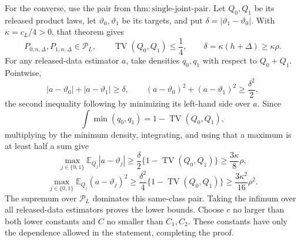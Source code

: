 For the converse, use the pair from \(\mathrm{thm:single\text{-}joint\text{-}pair}\).  Let \(Q_0,Q_1\) be its released product laws, let \(\vartheta_0,\vartheta_1\) be its targets, and put \(\delta=|\vartheta_1-\vartheta_0|\).  With \(\kappa=c_L/4>0\), that theorem gives
\[
 P_{0,n,\Delta},P_{1,n,\Delta}\in\mathcal P_L,
 \qquad
 \operatorname{TV}(Q_0,Q_1)\leq\frac14,
 \qquad
 \delta=\kappa(h+\Delta)\geq\kappa\rho.
\]
For any released-data estimator \(a\), take densities \(q_0,q_1\) with respect to \(Q_0+Q_1\).  Pointwise,
\[
 |a-\vartheta_0|+|a-\vartheta_1|\geq\delta,
 \qquad
 (a-\vartheta_0)^2+(a-\vartheta_1)^2\geq\frac{\delta^2}{2},
\]
the second inequality following by minimizing its left-hand side over \(a\).  Since
\[
 \int\min(q_0,q_1)=1-\operatorname{TV}(Q_0,Q_1),
\]
multiplying by the minimum density, integrating, and using that a maximum is at least half a sum give
\[
 \max_{j\in\{0,1\}}\mathbb E_{Q_j}|a-\vartheta_j|
 \geq\frac\delta2\{1-\operatorname{TV}(Q_0,Q_1)\}
 \geq\frac{3\kappa}{8}\rho,
\]
\[
 \max_{j\in\{0,1\}}\mathbb E_{Q_j}(a-\vartheta_j)^2
 \geq\frac{\delta^2}{4}\{1-\operatorname{TV}(Q_0,Q_1)\}
 \geq\frac{3\kappa^2}{16}\rho^2.
\]
The supremum over \(\mathcal P_L\) dominates this same-class pair.  Taking the infimum over all released-data estimators proves the lower bounds.  Choose \(c\) no larger than both lower constants and \(C\) no smaller than \(C_1,C_2\).  These constants have only the dependence allowed in the statement, completing the proof.